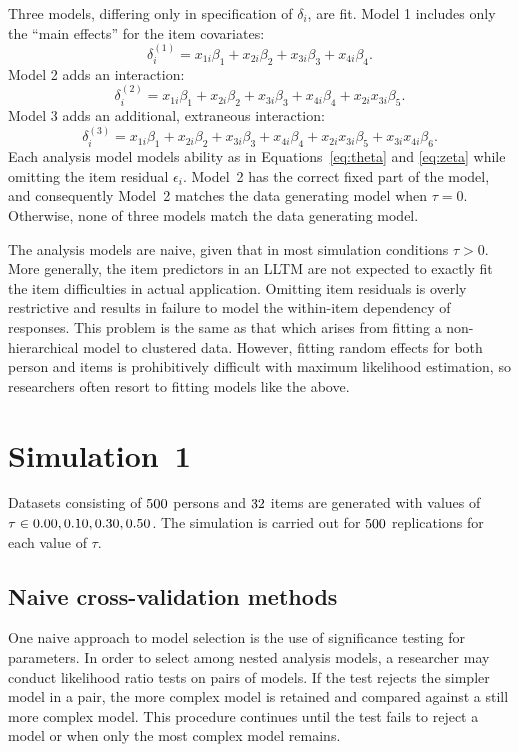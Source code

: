 \documentclass[12pt, letterpaper]{article}
\begin{document}
Three models, differing only in specification of $\delta_i$, are fit. Model 1 includes only the ``main effects'' for the item covariates:
\begin{equation}
\delta_i^{(1)} = x_{1i}\beta_1 + x_{2i}\beta_2 + x_{3i}\beta_3 + x_{4i}\beta_4
.\end{equation}
Model 2 adds an interaction:
\begin{equation}
\delta_i^{(2)} = x_{1i}\beta_1 + x_{2i}\beta_2 + x_{3i}\beta_3 + x_{4i}\beta_4
+ x_{2i}x_{3i}\beta_5
.\end{equation}
Model 3 adds an additional, extraneous interaction:
\begin{equation}
\delta_i^{(3)} = x_{1i}\beta_1 + x_{2i}\beta_2 + x_{3i}\beta_3 + x_{4i}\beta_4
+ x_{2i}x_{3i}\beta_5 + x_{3i}x_{4i}\beta_6
.\end{equation}
Each analysis model models ability as in Equations~\ref{eq:theta} and \ref{eq:zeta} while omitting the item residual $\epsilon_i$. 
Model~2 has the correct fixed part of the model, and consequently Model~2 matches the data generating model when $\tau = 0$. Otherwise, none of three models match the data generating model.
 
The analysis models are naive, given that in most simulation conditions $\tau > 0$. 
More generally, the item predictors in an LLTM are not expected to exactly fit the item difficulties in actual application.
Omitting item residuals is overly restrictive and results in failure to model the within-item dependency of responses. 
This problem is the same as that which arises from fitting a non-hierarchical model to clustered data. 
However, fitting random effects for both person and items is prohibitively difficult with maximum likelihood estimation, so researchers often resort to fitting models like the above.


\section{Simulation~1}

Datasets consisting of $500$ persons and $32$ items are generated with values of $\tau \in 0.00, 0.10, 0.30, {} 0.50$. The simulation is carried out for $500$ replications for each value of $\tau$. 


\subsection{Naive cross-validation methods}

One naive approach to model selection is the use of significance testing for parameters. In order to select among nested analysis models, a researcher may conduct likelihood ratio tests on pairs of models. If the test rejects the simpler model in a pair, the more complex model is retained and compared against a still more complex model. This procedure continues until the test fails to reject a model or when only the most complex model remains.
\end{document}
